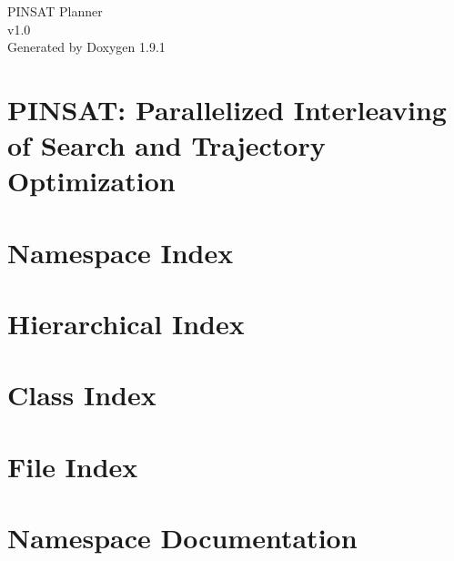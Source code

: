 \let\mypdfximage\pdfximage\def\pdfximage{\immediate\mypdfximage}\documentclass[twoside]{book}
\newcommand{\+}{\discretionary{\mbox{\scriptsize$\hookleftarrow$}}{}{}}
\newcommand{\clearemptydoublepage}{%
  \newpage{\pagestyle{empty}\cleardoublepage}%
}
\begin{document}
\raggedbottom

\hypersetup{pageanchor=false,
             bookmarksnumbered=true,
             pdfencoding=unicode
            }
\begin{titlepage}
\vspace*{7cm}
\begin{center}%
{\Large PINSAT Planner \\[1ex]\large v1.\+0 }\\
\vspace*{1cm}
{\large Generated by Doxygen 1.9.1}\\
\end{center}
\end{titlepage}
\clearemptydoublepage
{}
\tableofcontents
\clearemptydoublepage
{}
\hypersetup{pageanchor=true}

\chapter{PINSAT\+: Parallelized Interleaving of Search and Trajectory Optimization}
\label{index}\hypertarget{index}{}
\chapter{Namespace Index}

\chapter{Hierarchical Index}

\chapter{Class Index}

\chapter{File Index}

\chapter{Namespace Documentation}

\end{document}
